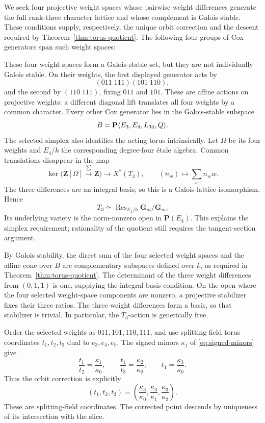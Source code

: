 \documentclass[11pt]{article}
\theoremstyle{remark}
\newcommand{\Gm}{\mathbf G_m}
\newcommand{\PP}{\mathbf P}
\begin{document}
We seek four projective weight spaces whose pairwise weight differences
generate the full rank-three character lattice and whose complement is Galois
stable.  These conditions supply, respectively, the unique orbit correction
and the descent required by Theorem~\ref{thm:torus-quotient}.  The following
four groups of Cox generators span such weight spaces:
\begin{center}
\IThreeWeightTable
\end{center}
These four weight spaces form a Galois-stable set, but they are not
individually Galois stable.  On their weights, the first displayed generator
acts by
\[
 (011\;111)(101\;110),
\]
and the second by \((110\;111)\), fixing \(011\) and \(101\).  These are
affine actions on projective weights: a different diagonal lift translates
all four weights by a common character.  Every other Cox generator lies in
the Galois-stable subspace
\begin{equation}
 B=\PP\langle\IThreeBoundaryGenerators\rangle.
 \label{eq:boundary-subspace}
\end{equation}
The selected simplex also identifies the acting torus intrinsically.
Let \(\Omega\) be its four weights and \(E_4/k\) the corresponding
degree-four \'etale algebra.  Common translations disappear in the map
\[
 \ker\bigl(\mathbf Z[\Omega]\xrightarrow{\sum}\mathbf Z\bigr)
 \longrightarrow X^*(T_3),\qquad (n_w)\longmapsto\sum_w n_w w.
\]
The three differences are an integral basis, so this is a Galois-lattice
isomorphism.  Hence
\[
 T_3\simeq\operatorname{Res}_{E_4/k}\Gm/\Gm.
\]
Its underlying variety is the norm-nonzero open in \(\PP(E_4)\).
This explains the simplex requirement; rationality of the quotient still
requires the tangent-section argument.

By Galois stability, the direct sum of the four selected weight spaces
and the affine cone over \(B\) are complementary subspaces defined over
\(k\), as required in Theorem~\ref{thm:torus-quotient}.
The determinant of the three weight differences from \((0,1,1)\) is one,
supplying the integral-basis condition.  On the open where the four
selected weight-space components are nonzero, a projective stabilizer fixes
their three ratios.  The three weight differences form a basis, so that
stabilizer is trivial.  In particular, the \(T_3\)-action is generically free.

Order the selected weights as \(011,101,110,111\), and use
splitting-field torus coordinates \(t_1,t_2,t_3\) dual to \(e_3,e_4,e_5\).
The signed minors \(\kappa_j\) of \eqref{eq:signed-minors} give
\[
 \frac{t_1}{t_2}=\frac{\kappa_1}{\kappa_0},\qquad
 \frac{t_1}{t_3}=\frac{\kappa_2}{\kappa_0},\qquad
 t_1=\frac{\kappa_3}{\kappa_0}.
\]
Thus the orbit correction is explicitly
\begin{equation}
 (t_1,t_2,t_3)=
 \left(\frac{\kappa_3}{\kappa_0},
       \frac{\kappa_3}{\kappa_1},
       \frac{\kappa_3}{\kappa_2}\right).
 \label{eq:rank-three-correction}
\end{equation}
These are splitting-field coordinates.  The corrected point descends by
uniqueness of its intersection with the slice.
\end{document}
